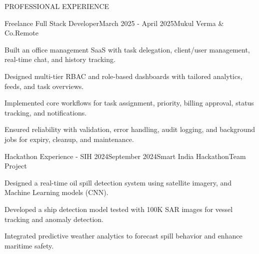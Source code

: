 \documentclass{resume}
\begin{document}
\begin{rSection}{PROFESSIONAL EXPERIENCE}

\begin{rExperience}{Freelance Full Stack Developer}{March 2025 - April 2025}{Mukul Verma \& Co.}{Remote}
\item Built an office management SaaS with task delegation, client/user management, real-time chat, and history tracking.
\item Designed multi-tier RBAC and role-based dashboards with tailored analytics, feeds, and task overviews.
\item Implemented core workflows for task assignment, priority, billing approval, status tracking, and notifications.
\item Ensured reliability with validation, error handling, audit logging, and background jobs for expiry, cleanup, and maintenance.
\end{rExperience}

\begin{rExperience}{Hackathon Experience - SIH 2024}{September 2024}{Smart India Hackathon}{Team Project}
\item Designed a real-time oil spill detection system using satellite imagery, and Machine Learning models (CNN).
\item Developed a ship detection model tested with 100K SAR images for vessel tracking and anomaly detection.
\item Integrated predictive weather analytics to forecast spill behavior and enhance maritime safety.
\end{rExperience}

\end{rSection}
\end{document}
